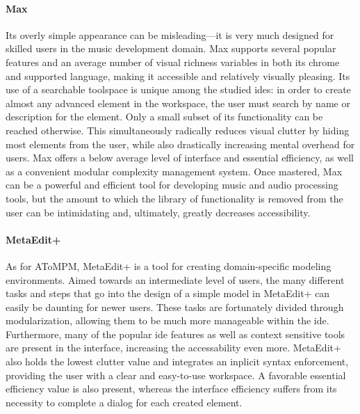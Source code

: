 \paragraph{Max} Its overly simple appearance can be misleading---it is
very much designed for skilled users in the music development domain. Max
supports several popular features and an average number of visual
richness variables in both its chrome and supported language, making it
accessible and relatively visually pleasing. Its use of a searchable
toolspace is unique among the studied \acp{ide}: in order to create
almost any advanced element in the workspace, the user must search by name
or description for the element. Only a small subset of its functionality
can be reached otherwise. This simultaneously radically reduces visual
clutter by hiding most elements from the user, while also drastically
increasing mental overhead for users. Max offers a below average level of
interface and essential efficiency, as well as a convenient modular
complexity management system. Once mastered, Max can be a powerful and
efficient tool for developing music and audio processing tools, but the
amount to which the library of functionality is removed from the user can
be intimidating and, ultimately, greatly decreases accessibility.

\paragraph{MetaEdit+} As for AToMPM, MetaEdit+ is a tool for creating domain-specific modeling environments.
Aimed towards an intermediate level of users, the
many different tasks and steps that go into the design of a simple model in
MetaEdit+ can easily be daunting for newer users.  These tasks are
fortunately divided through modularization, allowing them to be much more
manageable within the \ac{ide}. Furthermore, many of the popular \ac{ide}
features as well as context sensitive tools are present in the interface,
increasing the accessability even more. MetaEdit+ also holds the lowest
clutter value and integrates an inplicit syntax enforcement, providing the
user with a clear and easy-to-use workspace. A favorable essential
efficiency value is also present, whereas the interface efficiency suffers
from its necessity to complete a dialog for each created element.

